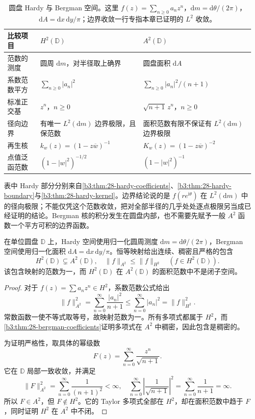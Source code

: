 \begin{table}[htbp]
\centering
\caption[圆盘 Hardy 与 Bergman 空间]{圆盘 Hardy 与 Bergman 空间。这里 \(f(z)=\sum_{n\ge0}a_nz^n\)，\(\mathrm{d}m=\mathrm{d}\theta/(2\pi)\)，\(\mathrm{d}A=\mathrm{d}x\,\mathrm{d}y/\pi\)；边界收敛一行专指本章已证明的 \(L^2\) 收敛。}
\label{b3:tab:28-hardy-bergman}
\small
\begin{tabularx}{\textwidth}{@{}p{5.5em}XX@{}}
\toprule
比较项目 & \(H^2(\mathbb D)\) & \(A^2(\mathbb D)\)\\
\midrule
范数的测度 & 圆周 \(\mathrm{d}m\)，对半径取上确界 & 圆盘面积 \(\mathrm{d}A\)\\
系数范数平方 & \(\sum_{n\ge0}|a_n|^2\) & \(\sum_{n\ge0}|a_n|^2/(n+1)\)\\
标准正交基 & \(z^n\)，\(n\ge0\) & \(\sqrt{n+1}\,z^n\)，\(n\ge0\)\\
径向边界 & 有唯一 \(L^2(\mathrm{d}m)\) 边界极限，且保范数 & 面积范数有限不保证有 \(L^2(\mathrm{d}m)\) 边界极限\\
再生核 & \(k_w(z)=(1-z\overline w)^{-1}\) & \(K_w(z)=(1-z\overline w)^{-2}\)\\
点值泛函范数 & \((1-|w|^2)^{-1/2}\) & \((1-|w|^2)^{-1}\)\\
\bottomrule
\end{tabularx}
\end{table}

表中 Hardy 部分分别来自\cref{b3:thm:28-hardy-coefficients}、\cref{b3:thm:28-hardy-boundary}与\cref{b3:thm:28-hardy-kernel}。边界结论说的是 \(f(re^{\mathrm{i}\theta})\) 在 \(L^2(\mathrm{d}m)\) 中的径向极限；不能仅凭这个范数收敛，把对全部半径的几乎处处逐点极限另当成已经证明的结论。Bergman 核的积分发生在圆盘内部，也不需要先赋予一般 \(A^2\) 函数一个平方可积的边界函数。

\begin{proposition}[两个空间的包含关系]\label{b3:prop:28-hardy-bergman-inclusion}
在单位圆盘 \(\mathbb D\) 上，Hardy 空间使用归一化圆周测度 \(\mathrm{d}m=\mathrm{d}\theta/(2\pi)\)，Bergman 空间使用归一化面积 \(\mathrm{d}A=\mathrm{d}x\,\mathrm{d}y/\pi\)。恒等映射给出连续、稠密且严格的包含
\[
 H^2(\mathbb D)\subsetneq A^2(\mathbb D),
 \quad \|f\|_{A^2}\le\|f\|_{H^2}\quad(f\in H^2(\mathbb D)).
\]
该包含映射的范数为一，而 \(H^2(\mathbb D)\) 在 \(A^2(\mathbb D)\) 的面积范数中不是闭子空间。
\end{proposition}
\begin{proof}
对于 \(f(z)=\sum a_nz^n\in H^2\)，系数范数公式给出
\[
 \|f\|_{A^2}^2=\sum_{n=0}^{\infty}\frac{|a_n|^2}{n+1}
 \le\sum_{n=0}^{\infty}|a_n|^2=\|f\|_{H^2}^2.
\]
常数函数一使不等式取等号，故映射范数为一。所有多项式都属于 \(H^2\)，而\cref{b3:thm:28-bergman-coefficients}证明多项式在 \(A^2\) 中稠密，因此包含是稠密的。

为证明严格性，取具体的幂级数
\[
 F(z)=\sum_{n=0}^{\infty}\frac{z^n}{\sqrt{n+1}}.
\]
它在 \(\mathbb D\) 局部一致收敛，并满足
\[
 \|F\|_{A^2}^2=\sum_{n=0}^{\infty}\frac1{(n+1)^2}<\infty,
 \quad
 \sum_{n=0}^{\infty}\left|\frac1{\sqrt{n+1}}\right|^2
 =\sum_{n=0}^{\infty}\frac1{n+1}=\infty.
\]
所以 \(F\in A^2\)，但 \(F\notin H^2\)。它的 Taylor 多项式全部在 \(H^2\)，却在面积范数中趋于 \(F\)，同时证明 \(H^2\) 在 \(A^2\) 中不闭。
\end{proof}

